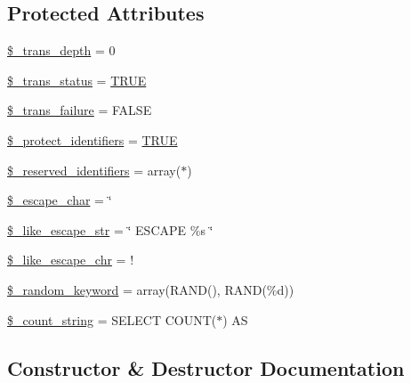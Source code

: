 \subsection*{Protected Attributes}
\begin{DoxyCompactItemize}
\item 
\mbox{\hyperlink{class_c_i___d_b__driver_a0724b7f82d62f35ef5e150146ed2a27b}{\$\+\_\+trans\+\_\+depth}} = 0
\item 
\mbox{\hyperlink{class_c_i___d_b__driver_a93acf0189d34131e156c6eb4a48c2b5b}{\$\+\_\+trans\+\_\+status}} = \mbox{\hyperlink{constants_8php_ae04a3efe6aa42044f803ee90c2277846}{T\+R\+UE}}
\item 
\mbox{\hyperlink{class_c_i___d_b__driver_afb63c722ff858ef7a4f662ec2930aad3}{\$\+\_\+trans\+\_\+failure}} = F\+A\+L\+SE
\item 
\mbox{\hyperlink{class_c_i___d_b__driver_a2e8a156a3c2abda43a4f160bcb5252e9}{\$\+\_\+protect\+\_\+identifiers}} = \mbox{\hyperlink{constants_8php_ae04a3efe6aa42044f803ee90c2277846}{T\+R\+UE}}
\item 
\mbox{\hyperlink{class_c_i___d_b__driver_aa3298c4c62fbee8bb09f1b75b633fb0d}{\$\+\_\+reserved\+\_\+identifiers}} = array(\textquotesingle{}$\ast$\textquotesingle{})
\item 
\mbox{\hyperlink{class_c_i___d_b__driver_aaec2fb0112850159063a8e47ad3aed6e}{\$\+\_\+escape\+\_\+char}} = \textquotesingle{}\char`\"{}\textquotesingle{}
\item 
\mbox{\hyperlink{class_c_i___d_b__driver_adf86ecadf3d0e1ce3f5e0eaeeb3867ae}{\$\+\_\+like\+\_\+escape\+\_\+str}} = \char`\"{} E\+S\+C\+A\+PE \textquotesingle{}\%s\textquotesingle{} \char`\"{}
\item 
\mbox{\hyperlink{class_c_i___d_b__driver_a668acfd923d0342389cd3a614628cf2a}{\$\+\_\+like\+\_\+escape\+\_\+chr}} = \textquotesingle{}!\textquotesingle{}
\item 
\mbox{\hyperlink{class_c_i___d_b__driver_a10213aa6e05f6d924d3277bb1d2fea00}{\$\+\_\+random\+\_\+keyword}} = array(\textquotesingle{}R\+A\+ND()\textquotesingle{}, \textquotesingle{}R\+A\+ND(\%d)\textquotesingle{})
\item 
\mbox{\hyperlink{class_c_i___d_b__driver_a06c80bac2ecbd0557827e96949c23097}{\$\+\_\+count\+\_\+string}} = \textquotesingle{}S\+E\+L\+E\+CT C\+O\+U\+NT($\ast$) AS \textquotesingle{}
\end{DoxyCompactItemize}


\subsection{Constructor \& Destructor Documentation}
\mbox{\label{class_c_i___d_b__driver_a9162320adff1a1a4afd7f2372f753a3e}} 
